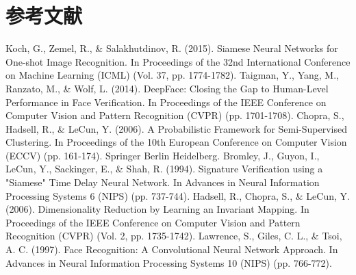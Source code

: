 \documentclass[UTF8]{ctexart}
\begin{document}
\section{参考文献}

\begin{thebibliography}{99}
   Koch, G., Zemel, R., \& Salakhutdinov, R. (2015). Siamese Neural Networks for One-shot Image Recognition. In Proceedings of the 32nd International Conference on Machine Learning (ICML) (Vol. 37, pp. 1774-1782).
   Taigman, Y., Yang, M., Ranzato, M., \& Wolf, L. (2014). DeepFace: Closing the Gap to Human-Level Performance in Face Verification. In Proceedings of the IEEE Conference on Computer Vision and Pattern Recognition (CVPR) (pp. 1701-1708).
   Chopra, S., Hadsell, R., \& LeCun, Y. (2006). A Probabilistic Framework for Semi-Supervised Clustering. In Proceedings of the 10th European Conference on Computer Vision (ECCV) (pp. 161-174). Springer Berlin Heidelberg.
   Bromley, J., Guyon, I., LeCun, Y., Sackinger, E., \& Shah, R. (1994). Signature Verification using a "Siamese" Time Delay Neural Network. In Advances in Neural Information Processing Systems 6 (NIPS) (pp. 737-744).
   Hadsell, R., Chopra, S., \& LeCun, Y. (2006). Dimensionality Reduction by Learning an Invariant Mapping. In Proceedings of the IEEE Conference on Computer Vision and Pattern Recognition (CVPR) (Vol. 2, pp. 1735-1742).
   Lawrence, S., Giles, C. L., \& Tsoi, A. C. (1997). Face Recognition: A Convolutional Neural Network Approach. In Advances in Neural Information Processing Systems 10 (NIPS) (pp. 766-772).
\end{thebibliography}
\end{document}
